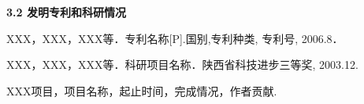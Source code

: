 \noindent\textbf{\small 3.2 发明专利和科研情况}

\begin{enumerate}[{[}1{]}] \wuhao
\item XXX，XXX，XXX等．专利名称[P].国别,专利种类, 专利号, 2006.8．
\item XXX，XXX，XXX等．科研项目名称．陕西省科技进步三等奖, 2003.12.
\item XXX项目，项目名称，起止时间，完成情况，作者贡献.
\end{enumerate}








 
